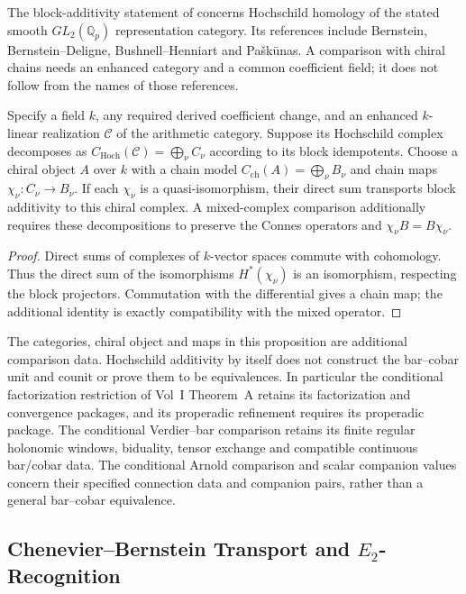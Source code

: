 The block-additivity statement of
 concerns Hochschild
homology of the stated smooth $GL_2(\mathbb Q_p)$ representation
category. Its references include Bernstein, Bernstein--Deligne,
Bushnell--Henniart and Pa{\v s}k{\=u}nas. A comparison with chiral
chains needs an enhanced category and a common coefficient field;
it does not follow from the names of those references.

\begin{proposition}
\label{v4-arith:w6-i:thm:W5-F-orthogonal}
Specify a field $k$, any required derived coefficient change, and
an enhanced $k$-linear realization $\mathcal C$ of the arithmetic
category. Suppose its Hochschild complex decomposes as
$C_{\mathrm{Hoch}}(\mathcal C)=\bigoplus_\nu C_\nu$ according to
its block idempotents. Choose a chiral object $A$ over $k$ with a
chain model $C_{\mathrm{ch}}(A)=\bigoplus_\nu B_\nu$ and chain maps
$\chi_\nu:C_\nu\to B_\nu$. If each $\chi_\nu$ is a
quasi-isomorphism, their direct sum transports block additivity to
this chiral complex. A mixed-complex comparison additionally
requires these decompositions to preserve the Connes operators
and $\chi_\nu B=B\chi_\nu$.
\end{proposition}
\begin{proof}
Direct sums of complexes of $k$-vector spaces commute with
cohomology. Thus the direct sum of the isomorphisms
$H^*(\chi_\nu)$ is an isomorphism, respecting the block projectors.
Commutation with the differential gives a chain map; the additional
identity is exactly compatibility with the mixed operator.
\end{proof}
The categories, chiral object and maps in this proposition are
additional comparison data. Hochschild additivity by itself does
not construct the bar--cobar unit and counit or prove them to be
equivalences. In particular the conditional factorization restriction
of Vol~I Theorem~A retains its factorization and convergence packages,
and its properadic refinement requires its properadic package.
The conditional Verdier--bar comparison retains its finite regular
holonomic windows, biduality, tensor exchange and compatible
continuous bar/cobar data. The conditional Arnold comparison and
scalar companion values concern their specified connection data
and companion pairs, rather than a general bar--cobar equivalence.

\subsection{Chenevier--Bernstein Transport and \(E_2\)-Recognition}
\label{v4-arith:w6-i:W5-H-alignment}

